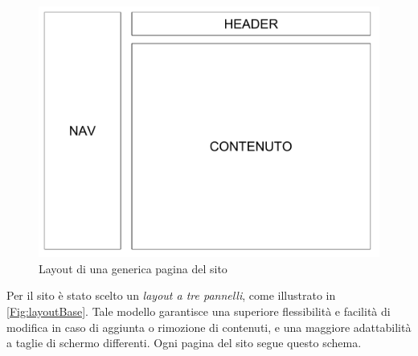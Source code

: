 \begin{figure}
	\includegraphics[width=1\linewidth]{sez/Progettazione/layout-base.pdf}
	\caption{Layout di una generica pagina del sito}
	\label{Fig:layoutBase}
\end{figure}

Per il sito è stato scelto un \textit{layout a tre pannelli}, come illustrato in \autoref{Fig:layoutBase}. Tale modello garantisce una superiore flessibilità e facilità di modifica in caso di aggiunta o rimozione di contenuti, e una maggiore adattabilità a taglie di schermo differenti. Ogni pagina del sito segue questo schema.